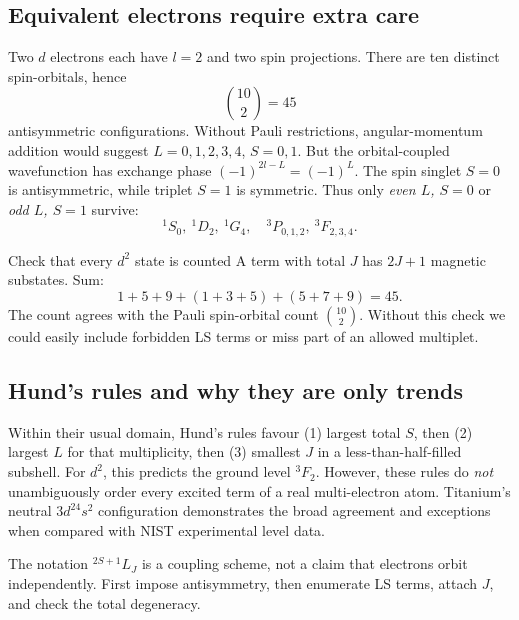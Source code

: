 \subsection{Equivalent electrons require extra care}
Two \(d\) electrons each have \(l=2\)
and two spin projections. There are
ten distinct spin-orbitals, hence
\[
\binom{10}{2}=45
\]
antisymmetric configurations.
Without Pauli restrictions, angular-momentum
addition would suggest \(L=0,1,2,3,4\),
\(S=0,1\). But the orbital-coupled
wavefunction has exchange phase
\((-1)^{2l-L}=(-1)^L\).
The spin singlet \(S=0\) is antisymmetric,
while triplet \(S=1\) is symmetric.
Thus only \emph{even \(L\), \(S=0\)}
or \emph{odd \(L\), \(S=1\)} survive:
\[
\boxed{{}^1S_0,\ {}^1D_2,\ {}^1G_4,\quad
{}^3P_{0,1,2},\ {}^3F_{2,3,4}.}
\]

\begin{worked}{Check that every \(d^2\) state is counted}
A term with total \(J\) has \(2J+1\)
magnetic substates. Sum:
\[
1+5+9+(1+3+5)+(5+7+9)=\boxed{45}.
\]
The count agrees with the Pauli
spin-orbital count \(\binom{10}{2}\).
Without this check we could easily
include forbidden LS terms or miss
part of an allowed multiplet.
\end{worked}

\subsection{Hund's rules and why they are only trends}
Within their usual domain, Hund's rules
favour (1) largest total \(S\), then
(2) largest \(L\) for that multiplicity,
then (3) smallest \(J\) in a
less-than-half-filled subshell.
For \(d^2\), this predicts
the ground level \({}^3F_2\).
However, these rules do \emph{not}
unambiguously order every excited term
of a real multi-electron atom.
Titanium's neutral \(3d^24s^2\)
configuration demonstrates the broad
agreement and exceptions when compared
with NIST experimental level data.

\begin{checkpoint}
The notation \({}^{2S+1}L_J\) is a
coupling scheme, not a claim that
electrons orbit independently.
First impose antisymmetry, then
enumerate LS terms, attach \(J\),
and check the total degeneracy.
\end{checkpoint}
